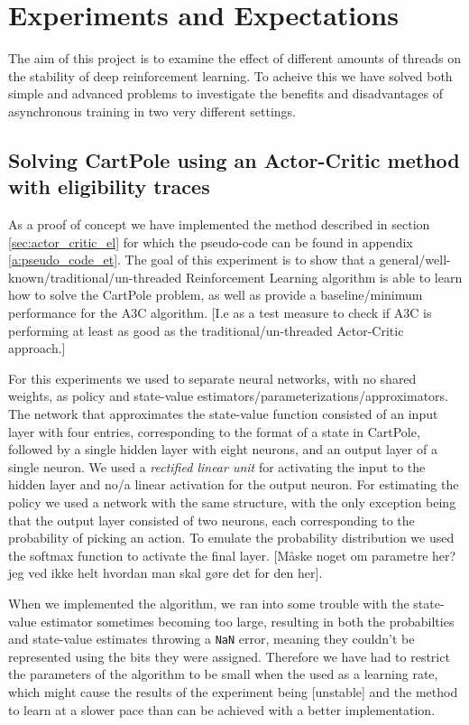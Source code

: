 \documentclass[11pt]{article}
\begin{document}

\section{Experiments and Expectations}

The aim of this project is to examine the effect of different amounts of threads
on the stability of deep reinforcement learning.
To acheive this we have solved both simple and advanced problems to investigate
the benefits and disadvantages of asynchronous training in two very different
settings.

\subsection{Solving CartPole using an Actor-Critic method with eligibility traces}

As a proof of concept we have implemented the method described in section
\ref{sec:actor_critic_el} for which the pseudo-code
can be found in appendix \ref{a:pseudo_code_et}.
The goal of this experiment is to show that a 
general/well-known/traditional/un-threaded Reinforcement Learning algorithm
is able to learn how to solve the CartPole problem, as well as provide a
baseline/minimum performance for the A3C algorithm.
[I.e as a test measure to check if A3C is performing at least as good
as the traditional/un-threaded Actor-Critic approach.]

For this experiments we used to separate neural networks, with no
shared weights, as policy and state-value estimators/parameterizations/approximators.
The network that approximates the state-value function consisted of an
input layer with four entries, corresponding to the format of a state in CartPole,
followed by a single hidden layer with eight neurons, and an output layer of a single
neuron.
We used a \textit{rectified linear unit} for activating the input to the
hidden layer and no/a linear activation for the output neuron.
For estimating the policy we used a network with the same structure,
with the only exception being that the output layer consisted of two
neurons, each corresponding to the probability of picking an action.
To emulate the probability distribution we used the softmax function
to activate the final layer.
[Måske noget om parametre her? jeg ved ikke helt hvordan man skal gøre
det for den her].

When we implemented the algorithm, we ran into some trouble with
the state-value estimator sometimes becoming too large, resulting
in both the probabilties and state-value estimates throwing a \texttt{NaN} error,
meaning they couldn't be represented using the bits they were assigned.
Therefore we have had to restrict the parameters of the algorithm to
be small when the used as a learning rate, which might cause the results of the
experiment being [unstable] and the method to learn at a slower pace
than can be achieved with a better implementation.
\end{document}

